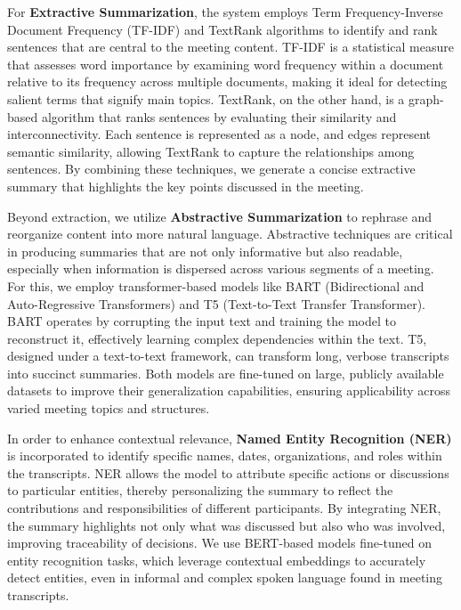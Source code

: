 \documentclass{article}
\begin{document}
For \textbf{Extractive Summarization}, the system employs Term Frequency-Inverse Document Frequency (TF-IDF) and TextRank algorithms to identify and rank sentences that are central to the meeting content. TF-IDF is a statistical measure that assesses word importance by examining word frequency within a document relative to its frequency across multiple documents, making it ideal for detecting salient terms that signify main topics. TextRank, on the other hand, is a graph-based algorithm that ranks sentences by evaluating their similarity and interconnectivity. Each sentence is represented as a node, and edges represent semantic similarity, allowing TextRank to capture the relationships among sentences. By combining these techniques, we generate a concise extractive summary that highlights the key points discussed in the meeting.

Beyond extraction, we utilize \textbf{Abstractive Summarization} to rephrase and reorganize content into more natural language. Abstractive techniques are critical in producing summaries that are not only informative but also readable, especially when information is dispersed across various segments of a meeting. For this, we employ transformer-based models like BART (Bidirectional and Auto-Regressive Transformers) and T5 (Text-to-Text Transfer Transformer). BART operates by corrupting the input text and training the model to reconstruct it, effectively learning complex dependencies within the text. T5, designed under a text-to-text framework, can transform long, verbose transcripts into succinct summaries. Both models are fine-tuned on large, publicly available datasets to improve their generalization capabilities, ensuring applicability across varied meeting topics and structures.

In order to enhance contextual relevance, \textbf{Named Entity Recognition (NER)} is incorporated to identify specific names, dates, organizations, and roles within the transcripts. NER allows the model to attribute specific actions or discussions to particular entities, thereby personalizing the summary to reflect the contributions and responsibilities of different participants. By integrating NER, the summary highlights not only what was discussed but also who was involved, improving traceability of decisions. We use BERT-based models fine-tuned on entity recognition tasks, which leverage contextual embeddings to accurately detect entities, even in informal and complex spoken language found in meeting transcripts.
\end{document}
